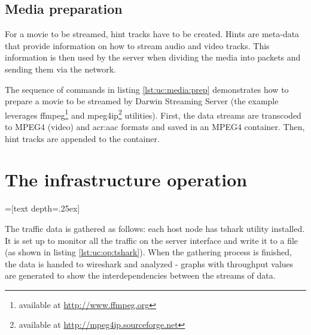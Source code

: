 \documentclass[11pt,openany]{book}
\begin{document}
      \subsection{Media preparation}
      \label{sub:}

        For a movie to be streamed, hint tracks have to be created. Hints are meta-data that provide information on how
        to stream audio and video tracks. This information is then used by the server when dividing the media into
        packets and sending them via the network.

        The sequence of commands in listing \ref{lst:uc:media:prep} demonstrates how to prepare a movie to be streamed
        by Darwin Streaming Server (the example leverages ffmpeg\footnote{available at \url{http://www.ffmpeg.org}} and
        mpeg4ip\footnote{available at \url{http://mpeg4ip.sourceforge.net}} utilities). First, the data streams are
        transcoded to MPEG4 (video) and \gls{acr:aac} formats and saved in an MPEG4 container. Then, hint tracks are
        appended to the container. \\

        \noindent
        \begin{minipage}{\textwidth}
          
        \end{minipage}


    \section{The infrastructure operation}
    \label{sec:uc:operation}

      =[text depth=.25ex]

      The traffic data is gathered as follows: each host node has tshark utility installed. It is set up to monitor all
      the traffic on the server interface and write it to a file (as shown in listing \ref{lst:uc:op:tshark}). When the
      gathering process is finished, the data is handed to wireshark and analyzed - graphs with throughput values are
      generated to show the interdependencies between the streams of data. \\

      \noindent
      \begin{minipage}{\textwidth}
        
      \end{minipage}
\end{document}
